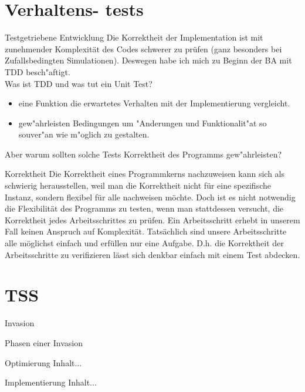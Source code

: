 \documentclass{beamer}
\begin{document}
\section{Verhaltens- tests}
\begin{frame}{Testgetriebene Entwicklung}
Die Korrektheit der Implementation ist mit zunehmender Komplexität des Codes schwerer zu prüfen (ganz besonders bei Zufallsbedingten Simulationen). Deswegen habe ich mich zu Beginn der BA mit TDD besch"aftigt.\\
Was ist TDD und was tut ein Unit Test?
\begin{itemize}
	\item eine Funktion die erwartetes Verhalten mit der Implementierung vergleicht.
	\item gew"ahrleisten Bedingungen um "Anderungen und Funktionalit"at so souver"an wie m"oglich zu gestalten.
\end{itemize}
Aber warum sollten solche Tests Korrektheit des Programms gew"ahrleisten?
\end{frame}

\begin{frame}{Korrektheit}
Die Korrektheit eines Programmkerns nachzuweisen kann sich als schwierig
herausstellen, weil man die Korrektheit nicht für eine spezifische Instanz,
sondern flexibel für alle nachweisen möchte. Doch ist es nicht notwendig
die Flexibilität des Programms zu testen, wenn man stattdessen versucht,
die Korrektheit jedes Arbeitsschrittes zu prüfen. Ein Arbeitsschritt erhebt
in unserem Fall keinen Anspruch auf Komplexität. Tatsächlich sind unsere
Arbeitsschritte alle möglichst einfach und erfüllen nur eine Aufgabe. D.h.
die Korrektheit der Arbeitsschritte zu verifizieren lässt sich denkbar einfach mit einem Test abdecken.
\end{frame}

\section{TSS}
\begin{frame}{Invasion}

\end{frame}

\begin{frame}{Phasen einer Invasion}

\end{frame}

\begin{frame}{Optimierung}
Inhalt...
\end{frame}

\begin{frame}{Implementierung}
Inhalt...
\end{frame}
\end{document}

